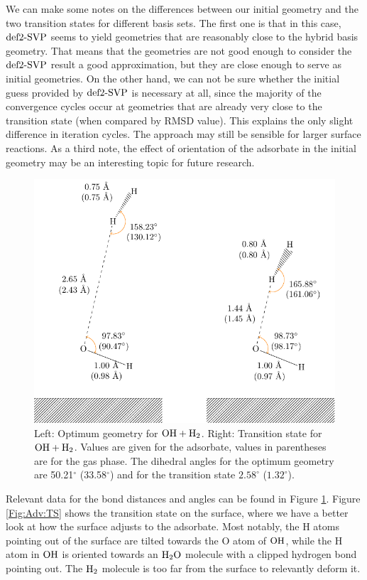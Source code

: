 We can make some notes on the differences between our initial geometry and the
two transition states for different basis sets. The first one is that in this
case, $\text{def2-SVP}$ seems to yield geometries that are reasonably close to the hybrid
basis geometry. That means that the geometries are not good
enough to consider the $\text{def2-SVP}$ result a good approximation, but they are close
enough to serve as initial geometries. On the other hand, we can not be sure
whether the initial guess provided by $\text{def2-SVP}$ is necessary at all, since the
majority of the convergence cycles occur at geometries that are already very
close to the transition state (when compared by RMSD value). This explains the
only slight difference in iteration cycles. The approach may still be sensible
for larger surface reactions. As a third note, the effect of orientation of the
adsorbate in the initial geometry may be an interesting topic for future
research.

\begin{figure}[t]
\centering
\includegraphics[width=.8\textwidth]{TikzPics/TikzCreation/HO.H2/HOH2.pdf}
\caption{Left: Optimum geometry for $\mbox{\ensuremath{\text O \text H+\text H_2}}$. Right: Transition state for $\mbox{\ensuremath{\text O \text H+\text H_2}}$.
Values are given for the adsorbate, values in parentheses are for the gas phase.
The
dihedral angles for the optimum geometry are 50.21$^{\circ}$ (33.58$^{\circ}$)
and for the transition state $2.58^{\circ}$ ($1.32^{\circ}$).}

\label{Fig:Adv:TSLengths}
\end{figure}


Relevant data for the bond distances and angles can be found in Figure
\ref{Fig:Adv:TSLengths}.
Figure \ref{Fig:Adv:TS} shows the transition state
on the surface, where we have a better look at how the surface adjusts to
the adsorbate. Most notably, the H atoms pointing out of the surface are
tilted towards the O atom of $\text O \text H$, while the H atom in $\text O \text H$ is oriented
towards an $\text H _2 \text O$ molecule with a clipped hydrogen bond pointing out. The
$\text H_2$ molecule is too far from the surface to relevantly deform it.

